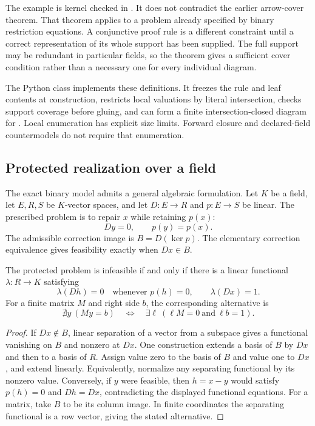 The example is kernel checked in . It does not contradict the earlier arrow-cover theorem. That theorem applies to a problem already specified by binary restriction equations. A conjunctive proof rule is a different constraint until a correct representation of its whole support has been supplied. The full support may be redundant in particular fields, so the theorem gives a sufficient cover condition rather than a necessary one for every individual diagram.

The Python class  implements these definitions. It freezes the rule and leaf contents at construction, restricts local valuations by literal intersection, checks support coverage before gluing, and can form a finite intersection-closed diagram for . Local enumeration has explicit size limits. Forward closure and declared-field countermodels do not require that enumeration.

\subsection{Protected realization over a field}

The exact binary model admits a general algebraic formulation. Let $K$ be a field, let $E,R,S$ be $K$-vector spaces, and let $D:E\to R$ and $p:E\to S$ be linear. The prescribed problem is to repair $x$ while retaining $p(x)$:
\[
Dy=0,\qquad p(y)=p(x).
\]
The admissible correction image is $B=D(\ker p)$. The elementary correction equivalence gives feasibility exactly when $Dx\in B$.

\begin{theorem}
\label{thm:linear-alternative}
The protected problem is infeasible if and only if there is a linear functional $\lambda:R\to K$ satisfying
\[
\lambda(Dh)=0\quad\text{whenever }p(h)=0,
\qquad \lambda(Dx)=1.
\]
For a finite matrix $M$ and right side $b$, the corresponding alternative is
\[
\nexists y\ (My=b)
\quad\Longleftrightarrow\quad
\exists\ell\ (\ell M=0\ \text{and}\ \ell b=1).
\]
\end{theorem}
\begin{proof}
If $Dx\notin B$, linear separation of a vector from a subspace gives a functional vanishing on $B$ and nonzero at $Dx$. One construction extends a basis of $B$ by $Dx$ and then to a basis of $R$. Assign value zero to the basis of $B$ and value one to $Dx$, and extend linearly. Equivalently, normalize any separating functional by its nonzero value. Conversely, if $y$ were feasible, then $h=x-y$ would satisfy $p(h)=0$ and $Dh=Dx$, contradicting the displayed functional equations. For a matrix, take $B$ to be its column image. In finite coordinates the separating functional is a row vector, giving the stated alternative.
\end{proof}

